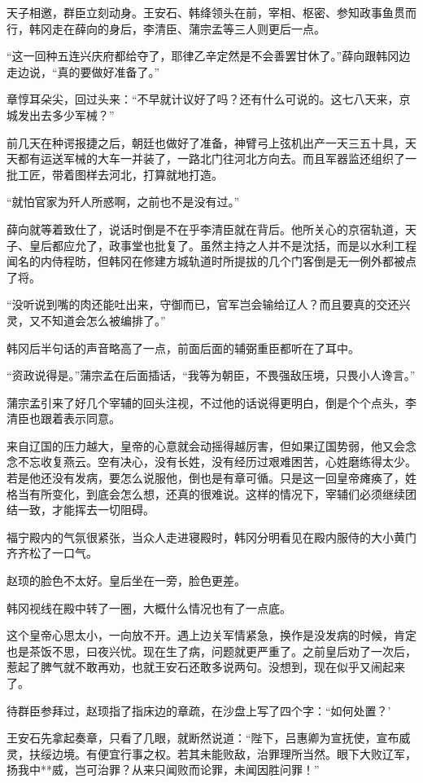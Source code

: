 天子相邀，群臣立刻动身。王安石、韩绛领头在前，宰相、枢密、参知政事鱼贯而行，韩冈走在薛向的身后，李清臣、蒲宗孟等三人则更后一点。

“这一回种五连兴庆府都给夺了，耶律乙辛定然是不会善罢甘休了。”薛向跟韩冈边走边说，“真的要做好准备了。”

章惇耳朵尖，回过头来：“不早就计议好了吗？还有什么可说的。这七八天来，京城发出去多少军械？”

前几天在种谔报捷之后，朝廷也做好了准备，神臂弓上弦机出产一天三五十具，天天都有运送军械的大车一并装了，一路北门往河北方向去。而且军器监还组织了一批工匠，带着图样去河北，打算就地打造。

“就怕官家为歼人所惑啊，之前也不是没有过。”

薛向就等着致仕了，说话时倒是不在乎李清臣就在背后。他所关心的京宿轨道，天子、皇后都应允了，政事堂也批复了。虽然主持之人并不是沈括，而是以水利工程闻名的内侍程昉，但韩冈在修建方城轨道时所提拔的几个门客倒是无一例外都被点了将。

“没听说到嘴的肉还能吐出来，守御而已，官军岂会输给辽人？而且要真的交还兴灵，又不知道会怎么被编排了。”

韩冈后半句话的声音略高了一点，前面后面的辅弼重臣都听在了耳中。

“资政说得是。”蒲宗孟在后面插话，“我等为朝臣，不畏强敌压境，只畏小人谗言。”

蒲宗孟引来了好几个宰辅的回头注视，不过他的话说得更明白，倒是个个点头，李清臣也跟着表示同意。

来自辽国的压力越大，皇帝的心意就会动摇得越厉害，但如果辽国势弱，他又会念念不忘收复燕云。空有决心，没有长姓，没有经历过艰难困苦，心姓磨练得太少。若是他还没有发病，要怎么说服他，倒也是有章可循。只是这一回皇帝瘫痪了，姓格当有所变化，到底会怎么想，还真的很难说。这样的情况下，宰辅们必须继续团结一致，才能挥去一切阻碍。

福宁殿内的气氛很紧张，当众人走进寝殿时，韩冈分明看见在殿内服侍的大小黄门齐齐松了一口气。

赵顼的脸色不太好。皇后坐在一旁，脸色更差。

韩冈视线在殿中转了一圈，大概什么情况也有了一点底。

这个皇帝心思太小，一向放不开。遇上边关军情紧急，换作是没发病的时候，肯定也是茶饭不思，曰夜兴忧。现在生了病，问题就更严重了。之前皇后劝了一次后，惹起了脾气就不敢再劝，也就王安石还敢多说两句。没想到，现在似乎又闹起来了。

待群臣参拜过，赵顼指了指床边的章疏，在沙盘上写了四个字：“如何处置？’

王安石先拿起奏章，只看了几眼，就断然说道：“陛下，吕惠卿为宣抚使，宣布威灵，扶绥边境。有便宜行事之权。若其未能败敌，治罪理所当然。眼下大败辽军，扬我中**威，岂可治罪？从来只闻败而论罪，未闻因胜问罪！”

